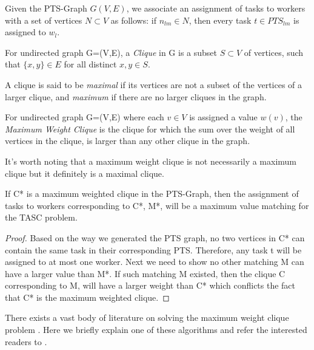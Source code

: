 Given the PTS-Graph $G(V, E)$, we associate an assignment of tasks to workers with a set of vertices $N \subset V$ as follows: if $n_{lm} \in N$, then every task $t \in PTS_{lm}$ is assigned to $w_l$.

\begin{definition} [Clique]
\label{def:clique}
For undirected graph G=(V,E), a \emph{Clique} in G is a subset $S \subset V$ of vertices, such that $\{x,y\} \in E$ for all distinct $x,y \in S$.
\end{definition}

A clique is said to be \emph{maximal} if its vertices are not a subset of the vertices of a larger clique, and \emph{maximum} if there are no larger cliques in the graph.

\begin{definition} 
\label{def:maxClique}
For undirected graph G=(V,E) where each $v \in V$ is assigned a value $w(v)$, the \emph{Maximum Weight Clique} is the clique for which the sum over the weight of all vertices in the clique, is larger than any other clique in the graph.
\end{definition}

It's worth noting that a maximum weight clique is not necessarily a maximum clique but it definitely is a maximal clique.

\begin{theorem}
\label{th:maxClique}
If C* is a maximum weighted clique in the PTS-Graph, then the assignment of tasks to workers corresponding to C*, M*, will be a maximum value matching for the TASC problem.
\end{theorem}

\begin{proof}
Based on the way we generated the PTS graph, no two vertices in C* can contain the same task in their corresponding PTS. Therefore, any task t will be assigned to at most one worker. Next we need to show no other matching M can have a larger value than M*. If such matching M existed, then the clique C corresponding to M, will have a larger weight than C* which conflicts the fact that C* is the maximum weighted clique.
\end{proof}

There exists a vast body of literature on solving the maximum weight clique problem \cite{Kovalyov07}. Here we briefly explain one of these algorithms and refer the interested readers to \cite{Ostergard01}.\\


